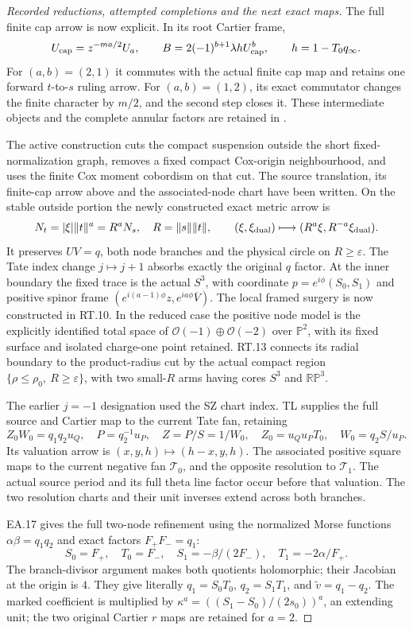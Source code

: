 \begin{proof}[Recorded reductions, attempted completions and the next exact maps]
The full finite cap arrow is now explicit. In its root
Cartier frame,
\[
 U_{\rm cap}=z^{-ma/2}U_a,\qquad
 B=2(-1)^{b+1}\lambda h U_{\rm cap}^{b},\qquad
 h=1-T_0q_\infty.
\]
For \((a,b)=(2,1)\) it commutes with the actual finite cap
map and retains one forward \(t\)-to-\(s\) ruling arrow.
For \((a,b)=(1,2)\), its exact commutator changes the finite
character by \(m/2\), and the second step closes it. These
intermediate objects and the complete annular factors are
retained in
.

The active construction cuts the compact suspension outside
the short fixed-normalization graph, removes a fixed compact
Cox-origin neighbourhood, and uses the finite Cox moment
cobordism on that cut. The source translation, its finite-cap
arrow above and the associated-node chart have been written.
On the stable outside portion the newly constructed exact
metric arrow is
\[
 N_t=|\xi|\|t\|^a=R^aN_s,\quad R=\|s\|\|t\|,\qquad
 (\xi,\xi_{\rm dual})\longmapsto
 (R^a\xi,R^{-a}\xi_{\rm dual}).
\]
It preserves \(UV=q\), both node branches and the physical
circle on \(R\ge\varepsilon\). The Tate index change
\(j\mapsto j+1\) absorbs exactly the original \(q\)
factor. At the inner boundary the fixed trace is the actual
\(S^3\), with coordinate \(p=e^{i\phi}(S_0,S_1)\) and
positive spinor frame
\((e^{i(a-1)\phi}z,e^{ia\phi}\overline V)\).
The local framed surgery is now constructed in RT.10. In the
reduced case the positive node model is the explicitly identified
total space of \(\mathcal O(-1)\oplus\mathcal O(-2)\) over
\(\mathbb P^2\), with its fixed surface and isolated charge-one
point retained. RT.13 connects its radial boundary to the
product-radius cut by the actual compact region
\(\{\rho\le\rho_0,\ R\ge\varepsilon\}\), with two small-\(R\)
arms having cores \(S^3\) and \(\mathbb{RP}^3\).

The earlier \(j=-1\) designation used the SZ chart index.
TL supplies the full source and Cartier map to the current Tate
fan, retaining
\[
 Z_0W_0=q_1q_2u_Q,\quad P=q_2^{-1}u_P,\quad
 Z=P/S=1/W_0,\quad Z_0=u_Qu_PT_0,\quad W_0=q_2S/u_P.
\]
Its valuation arrow is \((x,y,h)\mapsto(h-x,y,h)\).
The associated positive square maps to the current negative
fan \(\mathcal T_0\), and the opposite resolution to
\(\mathcal T_1\). The actual source period and its full theta
line factor occur before that valuation. The two resolution
charts and their unit inverses extend across both branches.

EA.17 gives the full two-node refinement using the normalized
Morse functions \(\alpha\beta=q_1q_2\) and exact factors
\(F_+F_-=q_1\):
\[
 S_0=F_+,\quad T_0=F_-,\quad
 S_1=-\beta/(2F_-),\quad T_1=-2\alpha/F_+.
\]
The branch-divisor argument makes both quotients holomorphic;
their Jacobian at the origin is \(4\). They give literally
\(q_1=S_0T_0\), \(q_2=S_1T_1\), and
\(\widetilde v=q_1-q_2\). The marked coefficient is multiplied
by \(\kappa^a=((S_1-S_0)/(2s_0))^a\), an extending unit;
the two original Cartier \(r\) maps are retained for \(a=2\).


\end{proof}
